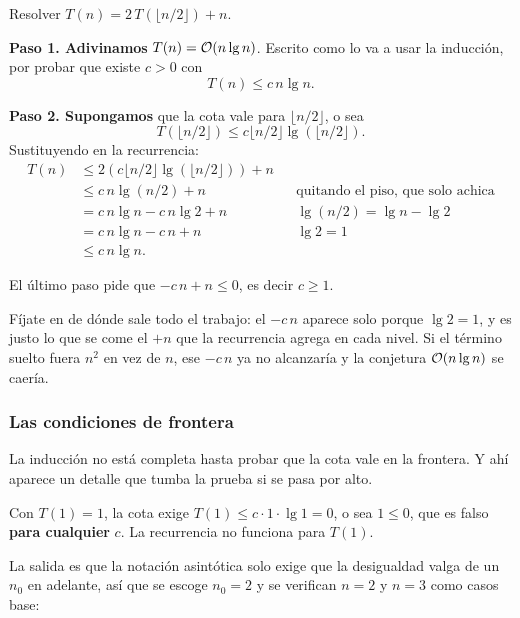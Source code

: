 \documentclass[11pt,letterpaper]{article}
\begin{document}
\begin{ejemplo}
  Resolver $T(n) = 2\,T(\lfloor n/2 \rfloor) + n$.

  \textbf{Paso 1. Adivinamos} $T(n) = \mathcal{O}\!\left(n \lg n\right)$. Escrito como lo
  va a usar la inducción, por probar que existe $c > 0$ con
  \[
      T(n) \leq c\,n \lg n .
  \]

  \textbf{Paso 2. Supongamos} que la cota vale para
  $\lfloor n/2 \rfloor$, o sea
  \[
      T(\lfloor n/2 \rfloor) \leq
      c \lfloor n/2 \rfloor \lg(\lfloor n/2 \rfloor) .
  \]
  Sustituyendo en la recurrencia:
  \begin{align*}
    T(n) &\leq 2\left( c \lfloor n/2 \rfloor
            \lg(\lfloor n/2 \rfloor) \right) + n \\
         &\leq c\,n \lg(n/2) + n
          && \text{quitando el piso, que solo achica} \\
         &= c\,n \lg n - c\,n \lg 2 + n
          && \lg(n/2) = \lg n - \lg 2 \\
         &= c\,n \lg n - c\,n + n
          && \lg 2 = 1 \\
         &\leq c\,n \lg n .
  \end{align*}

  El último paso pide que $-c\,n + n \leq 0$, es decir
  $\boxed{c \geq 1}$.
\end{ejemplo}

\begin{idea}
  Fíjate en de dónde sale todo el trabajo: el $-c\,n$ aparece solo
  porque $\lg 2 = 1$, y es justo lo que se come el $+n$ que la
  recurrencia agrega en cada nivel. Si el término suelto fuera $n^2$
  en vez de $n$, ese $-c\,n$ ya no alcanzaría y la conjetura
  $\mathcal{O}\!\left(n \lg n\right)$ se caería.
\end{idea}

\subsubsection*{Las condiciones de frontera}

La inducción no está completa hasta probar que la cota vale en la
frontera. Y ahí aparece un detalle que tumba la prueba si se pasa por
alto.

\begin{ojo}
  Con $T(1) = 1$, la cota exige $T(1) \leq c \cdot 1 \cdot \lg 1 = 0$,
  o sea $1 \leq 0$, que es falso \textbf{para cualquier} $c$. La
  recurrencia no funciona para $T(1)$.
\end{ojo}

La salida es que la notación asintótica solo exige que la desigualdad
valga de un $n_0$ en adelante, así que se escoge $n_0 = 2$ y se
verifican $n = 2$ y $n = 3$ como casos base:
\end{document}

